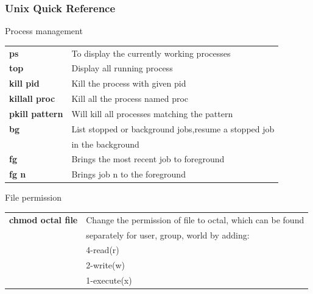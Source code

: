 \documentclass[10pt, hyperref={unicode=true,pdfusetitle, bookmarks=true,bookmarksnumbered=false,bookmarksopen=false, breaklinks=false,pdfborder={0 0 1},backref=true,colorlinks=true,linkcolor=darkblue,pageanchor}]{beamer}
\begin{document}
\begin{frame}
\frametitle{Unix Quick Reference}

\begin{block}{Process management}
\begin{tabular}{ll}
\textbf{ps}             & To display the currently working processes                              \tabularnewline
\textbf{top}            & Display all running process                                             \tabularnewline
\textbf{kill pid}       & Kill the process with given pid                                         \tabularnewline
\textbf{killall proc}   & Kill all the process named proc                                         \tabularnewline
\textbf{pkill pattern}  & Will kill all processes matching the pattern                            \tabularnewline
\textbf{bg}             & List stopped or background jobs,resume a stopped job                    \tabularnewline
                        & in the background                                                       \tabularnewline
\textbf{fg}             & Brings the most recent job to foreground                                \tabularnewline
\textbf{fg n}           & Brings job n to the foreground                                          \tabularnewline
\end{tabular}
\end{block}

\begin{block}{File permission}
\begin{tabular}{ll}
\textbf{chmod octal file}      & Change the permission of file to octal, which can be found \tabularnewline
                               & separately for user, group, world by adding:               \tabularnewline
 & 4-read(r)    \tabularnewline
 & 2-write(w)   \tabularnewline
 & 1-execute(x) \tabularnewline
\end{tabular}
\end{block}

\end{frame}
\end{document}
